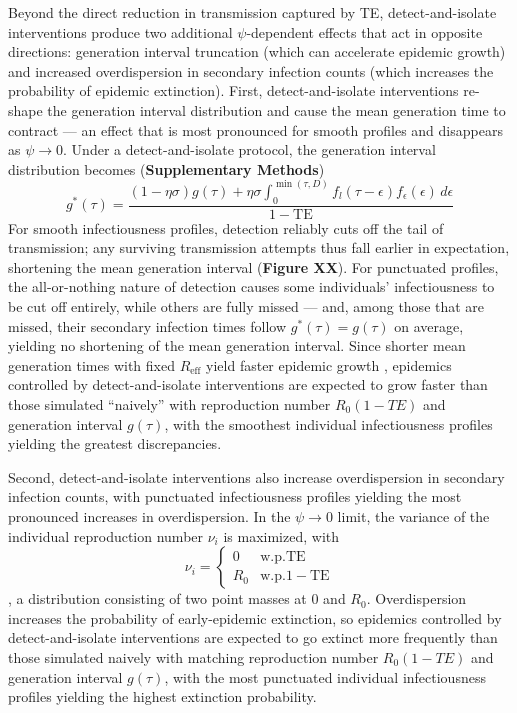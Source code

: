 Beyond the direct reduction in transmission captured by TE, detect-and-isolate interventions produce two additional $\psi$-dependent effects that act in opposite directions: generation interval truncation (which can accelerate epidemic growth) and increased overdispersion in secondary infection counts (which increases the probability of epidemic extinction). First, detect-and-isolate interventions re-shape the generation interval distribution and cause the mean generation time to contract --- an effect that is most pronounced for smooth profiles and disappears as $\psi \rightarrow 0$. Under a detect-and-isolate protocol, the generation interval distribution becomes  ({\bf Supplementary Methods})
\begin{equation}
g^*(\tau) = \frac{
	(1 - \eta \sigma) g(\tau) + \eta \sigma \int_0^{\min{(\tau,D)}} f_l(\tau - \epsilon) f_\epsilon(\epsilon) \, d\epsilon
}{
	1 - \text{TE}
}
\end{equation}
For smooth infectiousness profiles, detection reliably cuts off the tail of transmission; any surviving transmission attempts thus fall earlier in expectation, shortening the mean generation interval ({\bf Figure XX}). For punctuated profiles, the all-or-nothing nature of detection causes some individuals' infectiousness to be cut off entirely, while others are fully missed --- and, among those that are missed, their secondary infection times follow $g^*(\tau) = g(\tau)$ on average, yielding no shortening of the mean generation interval. Since shorter mean generation times with fixed $R_\text{eff}$ yield faster epidemic growth  \citep{wallinga_how_2007}, epidemics controlled by detect-and-isolate interventions are expected to grow faster than those simulated ``naively'' with reproduction number $R_0 (1 - TE)$ and generation interval $g(\tau)$, with the smoothest individual infectiousness profiles yielding the greatest discrepancies.

Second, detect-and-isolate interventions also increase overdispersion in secondary infection counts, with punctuated infectiousness profiles yielding the most pronounced increases in overdispersion. In the $\psi \rightarrow 0$ limit, the variance of the individual reproduction number $\nu_i$ is maximized, with 
\begin{equation}
	\nu_i = \begin{cases}
		0 & \text{w.p.}  \text{TE} \\ 
		R_0  & \text{w.p.} 1-\text{TE}
	\end{cases}
\end{equation}
\ie, a distribution consisting of two point masses at 0 and $R_0$. Overdispersion increases the probability of early-epidemic extinction, so epidemics controlled by detect-and-isolate interventions are expected to go extinct more frequently than those simulated naively with matching reproduction number $R_0 (1-TE)$ and generation interval $g(\tau)$, with the most punctuated individual infectiousness profiles yielding the highest extinction probability. 

